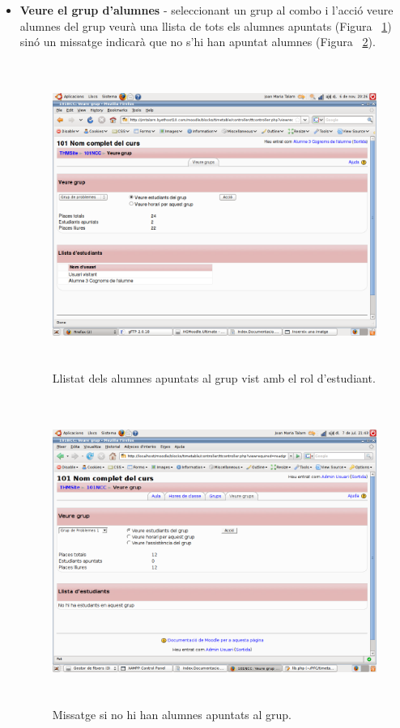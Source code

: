 \documentclass[a4paper]{report}  %
\begin{document}
\begin{itemize}
\item\textbf{Veure el grup d'alumnes} - seleccionant un grup al combo i l'acció veure alumnes del grup veurà una llista de tots els alumnes apuntats (Figura ~\ref{fig:VeureGrupEstudiantsRolStudent}) sinó un missatge indicarà que no s'hi han apuntat alumnes (Figura ~\ref{fig:VeureGrupEstudiantsNingu}).
		\begin{figure}[H] %
		\begin{center}
		\includegraphics[height=10cm,width=12cm]{img/VeureGrupEstudiantsRolStudent.png}
		\caption[List caption]{Llistat dels alumnes apuntats al grup vist amb el rol d'estudiant.}
		\label{fig:VeureGrupEstudiantsRolStudent}
		\end{center}
		\end{figure}

		\begin{figure}[H] %
		\begin{center}
		\includegraphics[height=10cm,width=12cm]{img/VeureGrupEstudiantsNingu.png}
		\caption[List caption]{Missatge si no hi han alumnes apuntats al grup.}
		\label{fig:VeureGrupEstudiantsNingu}
		\end{center}
		\end{figure}


\end{itemize}
\end{document}
